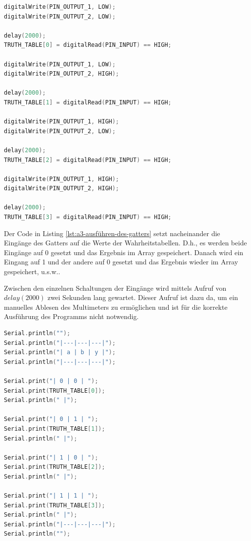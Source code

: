 \begin{lstlisting}[language=C,label={lst:a3-ausführen-des-gatters}, caption={Ausführen der Logikfunktionen}]
digitalWrite(PIN_OUTPUT_1, LOW);
digitalWrite(PIN_OUTPUT_2, LOW);

delay(2000);
TRUTH_TABLE[0] = digitalRead(PIN_INPUT) == HIGH;

digitalWrite(PIN_OUTPUT_1, LOW);
digitalWrite(PIN_OUTPUT_2, HIGH);

delay(2000);
TRUTH_TABLE[1] = digitalRead(PIN_INPUT) == HIGH;

digitalWrite(PIN_OUTPUT_1, HIGH);
digitalWrite(PIN_OUTPUT_2, LOW);

delay(2000);
TRUTH_TABLE[2] = digitalRead(PIN_INPUT) == HIGH;

digitalWrite(PIN_OUTPUT_1, HIGH);
digitalWrite(PIN_OUTPUT_2, HIGH);

delay(2000);
TRUTH_TABLE[3] = digitalRead(PIN_INPUT) == HIGH;
\end{lstlisting}

Der Code in Listing \ref{lst:a3-ausführen-des-gatters} setzt nacheinander die Eingänge des Gatters auf die Werte der Wahrheitstabellen.
D.h., es werden beide Eingänge auf 0 gesetzt und das Ergebnis im Array gespeichert.
Danach wird ein Eingang auf 1 und der andere auf 0 gesetzt und das Ergebnis wieder im Array gespeichert, u.s.w..

Zwischen den einzelnen Schaltungen der Eingänge wird mittels Aufruf von $delay(2000)$ zwei Sekunden lang gewartet.
Dieser Aufruf ist dazu da, um ein manuelles Ablesen des Multimeters zu ermöglichen und ist für die korrekte Ausführung des Programms nicht notwendig.

\begin{lstlisting}[language=C,label={lst:a3-aausgabe-der-wahrheitstabelle}, caption={Ausgabe der Wahrheitstabelle}]
Serial.println("");
Serial.println("|---|---|---|");
Serial.println("| a | b | y |");
Serial.println("|---|---|---|");

Serial.print("| 0 | 0 | ");
Serial.print(TRUTH_TABLE[0]);
Serial.println(" |");

Serial.print("| 0 | 1 | ");
Serial.print(TRUTH_TABLE[1]);
Serial.println(" |");

Serial.print("| 1 | 0 | ");
Serial.print(TRUTH_TABLE[2]);
Serial.println(" |");

Serial.print("| 1 | 1 | ");
Serial.print(TRUTH_TABLE[3]);
Serial.println(" |");
Serial.println("|---|---|---|");
Serial.println("");
\end{lstlisting}

